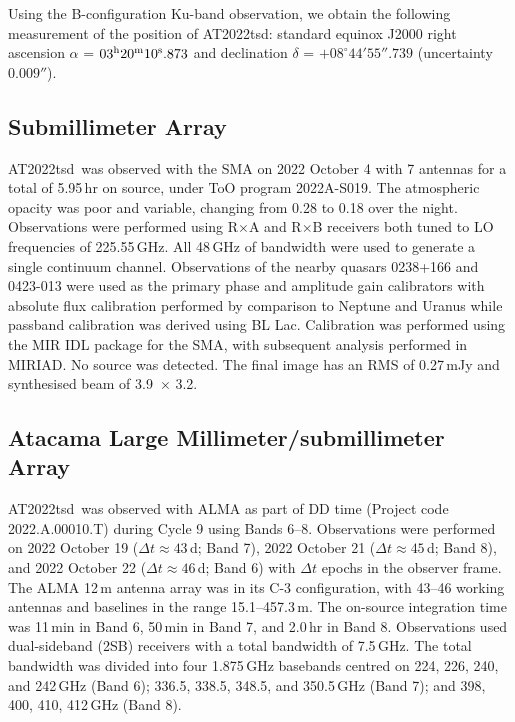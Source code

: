 \documentclass{nature_plusfigure}
\newcommand{\at}{AT2022tsd}
\begin{document}
\begin{methods}
Using the B-configuration Ku-band observation, we obtain the following measurement of the position of \at:
standard equinox J2000 right ascension $\alpha$ =
$03^{\rm{h}}20^{\rm{m}}10^{\rm{s}}.873$
and declination $\delta$ = $+08^{\circ} 44' 55''.739$ 
(uncertainty $0.009''$).

\subsection{Submillimeter Array}
\label{Methods:SMA}

\at\ was observed with the SMA on 2022 October 4 with 7 antennas for a total of 5.95\,hr on source, under ToO program 2022A-S019. The atmospheric opacity was poor and variable, changing from 0.28 to 0.18 over the night. Observations were performed using R$\times$A and R$\times$B receivers both tuned to LO frequencies of 225.55\,GHz. All 48\,GHz of bandwidth were used to generate a single continuum channel. Observations of the nearby quasars 0238+166 and 0423-013 were used as the primary phase and amplitude gain calibrators with absolute flux calibration performed by comparison to Neptune and Uranus while passband calibration was derived using BL Lac. Calibration was performed using the MIR IDL package for the SMA, with subsequent analysis performed in MIRIAD. No source was detected. The final image has an RMS of 0.27\,mJy and synthesised beam of 3.9\arcsec\ $\times$ 3.2\arcsec.

\subsection{Atacama Large Millimeter/submillimeter Array}
\label{sec:ALMA}

\at\ was observed with ALMA as part of DD time (Project code 2022.A.00010.T) during Cycle 9 using Bands 6--8. Observations were performed on 2022 October 19 ($\Delta t \approx 43$\,d; Band 7), 2022 October 21 ($\Delta t \approx 45$\,d; Band 8), and 2022 October 22 ($\Delta t \approx 46$\,d; Band 6) with $\Delta t$ epochs in the observer frame. The ALMA 12\,m antenna array was in its C-3 configuration, with
43--46 working antennas and baselines in the range 15.1--457.3\,m. The on-source integration time was
11\,min in Band 6, 50\,min in Band 7, and 2.0\,hr in Band 8.
Observations used dual-sideband (2SB) receivers with a total bandwidth of 7.5\,GHz. The total bandwidth was divided into four 1.875\,GHz basebands centred on 224, 226, 240, and 242\,GHz (Band 6);
336.5, 338.5, 348.5, and 350.5\,GHz (Band 7);
and 398, 400, 410, 412\,GHz (Band 8).


\end{methods}
\end{document}
